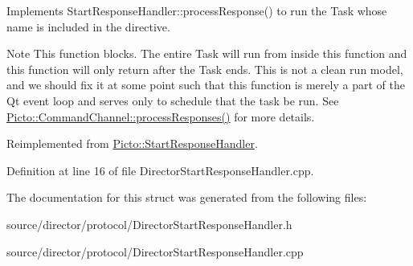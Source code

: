 Implements Start\-Response\-Handler\-::process\-Response() to run the Task whose name is included in the directive. 

\begin{DoxyNote}{Note}
This function blocks. The entire Task will run from inside this function and this function will only return after the Task ends. This is not a clean run model, and we should fix it at some point such that this function is merely a part of the Qt event loop and serves only to schedule that the task be run. See \hyperlink{class_picto_1_1_command_channel_aafe619791fb542563544ecf50628238b}{Picto\-::\-Command\-Channel\-::process\-Responses()} for more details. 
\end{DoxyNote}


Reimplemented from \hyperlink{struct_picto_1_1_start_response_handler}{Picto\-::\-Start\-Response\-Handler}.



Definition at line 16 of file Director\-Start\-Response\-Handler.\-cpp.



The documentation for this struct was generated from the following files\-:\begin{DoxyCompactItemize}
\item 
source/director/protocol/Director\-Start\-Response\-Handler.\-h\item 
source/director/protocol/Director\-Start\-Response\-Handler.\-cpp\end{DoxyCompactItemize}
